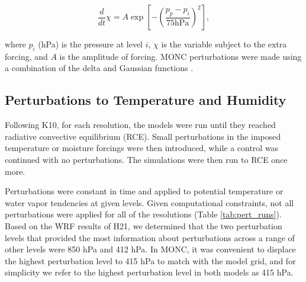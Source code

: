 \documentclass[draft]{agujournal2019}
\begin{document}
\begin{equation}
\frac{d}{dt} \chi = A \exp\left[ - \left( \frac{p_p - p_i}{75 \textrm{hPa}}\right)^2 \right],
\end{equation}

\noindent where $p_i$ (hPa) is the pressure at level $i$, $\chi$ is the variable
subject to the extra forcing, and $A$ is the amplitude of forcing. MONC
perturbations were made using a combination of the delta and Gaussian functions
\cite{Herman_JAMES_2013}. 

\subsection{Perturbations to Temperature and Humidity}

Following K10, for each resolution, the models were run until they reached
radiative convective equilibrium (RCE). Small perturbations in the imposed
temperature or moisture forcings were then introduced, while a control was
continued with no perturbations. The simulations were then run to RCE once more. 
 
Perturbations were constant in time and applied to potential temperature or
water vapor tendencies at given levels. Given computational constraints, not all
perturbations were applied for all of the resolutions (Table
\ref{tab:pert_runs}). Based on the WRF results of H21, we determined that the
two perturbation levels that provided the most information about perturbations
across a range of other levels were 850 hPa and 412 hPa. In MONC, it was
convenient to displace the highest perturbation level to 415 hPa to match with
the model grid, and for simplicity we refer to the highest perturbation level in
both models as 415 hPa.
\end{document}
